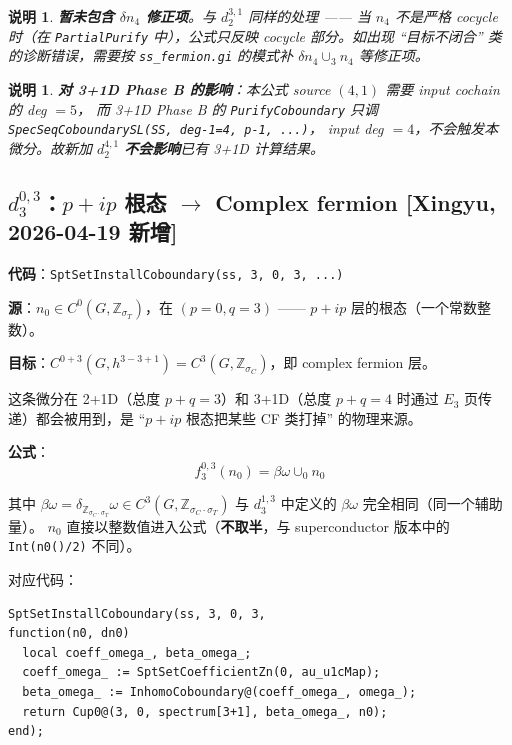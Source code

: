\documentclass[a4paper,fontset=ubuntu,12pt]{ctexart}
\newtheorem{remark}[definition]{说明}
\newcommand{\ZZ}{\mathbb{Z}}
\newcommand{\aT}{\sigma_T}
\newcommand{\aC}{\sigma_C}
\begin{document}
\begin{remark}
\textbf{暂未包含 $\delta n_4$ 修正项}。与 $d_2^{3, 1}$ 同样的处理 —— 当 $n_4$ 不是严格 cocycle 时（在 \texttt{PartialPurify} 中），公式只反映 cocycle 部分。如出现 ``目标不闭合'' 类的诊断错误，需要按 \texttt{ss\_fermion.gi} 的模式补 $\delta n_4 \cup_3 n_4$ 等修正项。
\end{remark}

\begin{remark}
\textbf{对 3+1D Phase B 的影响}：本公式 source $(4, 1)$ 需要 input cochain 的 deg $= 5$，
而 3+1D Phase B 的 \texttt{PurifyCoboundary} 只调 \texttt{SpecSeqCoboundarySL(SS, deg-1=4, p-1, ...)}，
input deg $= 4$，不会触发本微分。故新加 $d_2^{4, 1}$ \textbf{不会影响}已有 3+1D 计算结果。
\end{remark}

\subsection{\texorpdfstring{$d_3^{0,3}$}{d3(0,3)}：$p+ip$ 根态 $\to$ Complex fermion \textmd{[Xingyu, 2026-04-19 新增]}}
\label{sec:d3-03}

\textbf{代码}：\texttt{SptSetInstallCoboundary(ss, 3, 0, 3, ...)}

\textbf{源}：$n_0 \in C^0(G, \ZZ_{\aT})$，在 $(p = 0, q = 3)$ —— $p+ip$ 层的根态（一个常数整数）。

\textbf{目标}：$C^{0+3}(G, h^{3-3+1}) = C^3(G, \ZZ_{\aC})$，即 complex fermion 层。

这条微分在 2+1D（总度 $p+q=3$）和 3+1D（总度 $p+q=4$ 时通过 $E_3$ 页传递）都会被用到，是 ``$p+ip$ 根态把某些 CF 类打掉'' 的物理来源。

\textbf{公式}：
\begin{equation}
\label{eq:d3-03}
\boxed{f_3^{0,3}(n_0) = \beta\omega \cup_0 n_0}
\end{equation}

其中 $\beta\omega = \delta_{\ZZ_{\aC \cdot \aT}} \omega \in C^3(G, \ZZ_{\aC \cdot \aT})$ 与 $d_3^{1,3}$ 中定义的 $\beta\omega$ 完全相同（同一个辅助量）。
$n_0$ 直接以整数值进入公式（\textbf{不取半}，与 superconductor 版本中的 \texttt{Int(n0()/2)} 不同）。

对应代码：
\begin{lstlisting}
SptSetInstallCoboundary(ss, 3, 0, 3,
function(n0, dn0)
  local coeff_omega_, beta_omega_;
  coeff_omega_ := SptSetCoefficientZn(0, au_u1cMap);
  beta_omega_ := InhomoCoboundary@(coeff_omega_, omega_);
  return Cup0@(3, 0, spectrum[3+1], beta_omega_, n0);
end);
\end{lstlisting}
\end{document}
